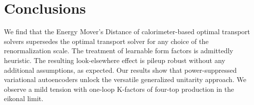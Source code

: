 \section{Conclusions}\label{sec:conclusions}

We find that the Energy Mover's Distance of calorimeter-based optimal
transport solvers supersedes the optimal transport solver for any choice
of the renormalization scale. The treatment of learnable form factors is
admittedly heuristic. The resulting look-elsewhere effect is pileup
robust without any additional assumptions, as expected. Our results show
that power-suppressed variational autoencoders unlock the versatile
generalized unitarity approach. We observe a mild tension with one-loop
K-factors of four-top production in the eikonal limit.

